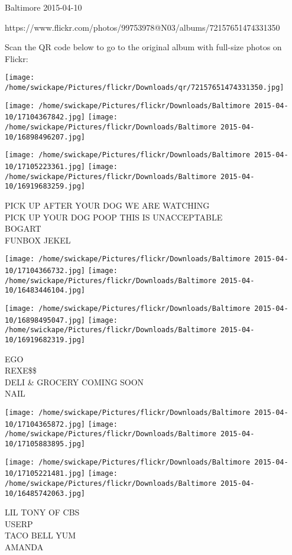 \documentclass[10pt,letterpaper]{article}
\begin{document}
Baltimore 2015-04-10

https://www.flickr.com/photos/99753978@N03/albums/72157651474331350

Scan the QR code below to go to the original album with full-size photos on Flickr:

\texttt{[image: /home/swickape/Pictures/flickr/Downloads/qr/72157651474331350.jpg]}
\pagebreak

\texttt{[image: /home/swickape/Pictures/flickr/Downloads/Baltimore 2015-04-10/17104367842.jpg]}
\texttt{[image: /home/swickape/Pictures/flickr/Downloads/Baltimore 2015-04-10/16898496207.jpg]}

\texttt{[image: /home/swickape/Pictures/flickr/Downloads/Baltimore 2015-04-10/17105223361.jpg]}
\texttt{[image: /home/swickape/Pictures/flickr/Downloads/Baltimore 2015-04-10/16919683259.jpg]}

PICK UP AFTER YOUR DOG WE ARE WATCHING\\
PICK UP YOUR DOG POOP THIS IS UNACCEPTABLE\\
BOGART\\
FUNBOX JEKEL
\pagebreak

\texttt{[image: /home/swickape/Pictures/flickr/Downloads/Baltimore 2015-04-10/17104366732.jpg]}
\texttt{[image: /home/swickape/Pictures/flickr/Downloads/Baltimore 2015-04-10/16483446104.jpg]}

\texttt{[image: /home/swickape/Pictures/flickr/Downloads/Baltimore 2015-04-10/16898495047.jpg]}
\texttt{[image: /home/swickape/Pictures/flickr/Downloads/Baltimore 2015-04-10/16919682319.jpg]}

EGO\\
REXE\$\$\\
DELI \& GROCERY COMING SOON\\
NAIL
\pagebreak

\texttt{[image: /home/swickape/Pictures/flickr/Downloads/Baltimore 2015-04-10/17104365872.jpg]}
\texttt{[image: /home/swickape/Pictures/flickr/Downloads/Baltimore 2015-04-10/17105883895.jpg]}

\texttt{[image: /home/swickape/Pictures/flickr/Downloads/Baltimore 2015-04-10/17105221481.jpg]}
\texttt{[image: /home/swickape/Pictures/flickr/Downloads/Baltimore 2015-04-10/16485742063.jpg]}

LIL TONY OF CBS\\
USERP\\
TACO BELL YUM\\
AMANDA
\pagebreak
\end{document}
